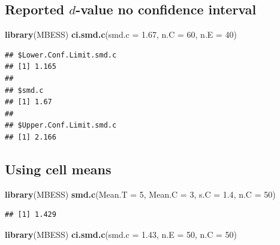 \documentclass[
]{krantz}
\makeatletter
\newenvironment{Shaded}{\begin{snugshade}}{\end{snugshade}}
\newcommand{\DataTypeTok}[1]{\textcolor[rgb]{0.27,0.27,0.27}{#1}}
\newcommand{\DecValTok}[1]{\textcolor[rgb]{0.06,0.06,0.06}{#1}}
\newcommand{\FloatTok}[1]{\textcolor[rgb]{0.06,0.06,0.06}{#1}}
\newcommand{\KeywordTok}[1]{\textcolor[rgb]{0.27,0.27,0.27}{\textbf{#1}}}
\newcommand{\NormalTok}[1]{#1}
\newenvironment{kframe}{%
\medskip{}
\setlength{\fboxsep}{.8em}
 \def\at@end@of@kframe{}%
 \ifinner\ifhmode%
  \def\at@end@of@kframe{\end{minipage}}%
  \begin{minipage}{\columnwidth}%
 \fi\fi%
 \def\FrameCommand##1{\hskip\@totalleftmargin \hskip-\fboxsep
 \colorbox{shadecolor}{##1}\hskip-\fboxsep
     \hskip-\linewidth \hskip-\@totalleftmargin \hskip\columnwidth}%
 \MakeFramed {\advance\hsize-\width
   \@totalleftmargin\z@ \linewidth\hsize
   \@setminipage}}%
 {\par\unskip\endMakeFramed%
 \at@end@of@kframe}
\renewenvironment{Shaded}{\begin{kframe}}{\end{kframe}}
\makeatother
\begin{document}
\hypertarget{reported-d-value-no-confidence-interval-1}{%
\subsection{\texorpdfstring{Reported \(d\)-value no confidence interval}{Reported d-value no confidence interval}}\label{reported-d-value-no-confidence-interval-1}}

\begin{Shaded}
\begin{Highlighting}[]
\KeywordTok{library}\NormalTok{(MBESS)}
\KeywordTok{ci.smd.c}\NormalTok{(}\DataTypeTok{smd.c =} \FloatTok{1.67}\NormalTok{, }\DataTypeTok{n.C =} \DecValTok{60}\NormalTok{, }\DataTypeTok{n.E =} \DecValTok{40}\NormalTok{) }
\end{Highlighting}
\end{Shaded}

\begin{verbatim}
## $Lower.Conf.Limit.smd.c
## [1] 1.165
## 
## $smd.c
## [1] 1.67
## 
## $Upper.Conf.Limit.smd.c
## [1] 2.166
\end{verbatim}

\hypertarget{using-cell-means-1}{%
\subsection{Using cell means}\label{using-cell-means-1}}

\begin{Shaded}
\begin{Highlighting}[]
\KeywordTok{library}\NormalTok{(MBESS)}
\KeywordTok{smd.c}\NormalTok{(}\DataTypeTok{Mean.T =} \DecValTok{5}\NormalTok{,}
    \DataTypeTok{Mean.C =} \DecValTok{3}\NormalTok{, }
    \DataTypeTok{s.C =} \FloatTok{1.4}\NormalTok{, }
    \DataTypeTok{n.C =} \DecValTok{50}\NormalTok{) }
\end{Highlighting}
\end{Shaded}

\begin{verbatim}
## [1] 1.429
\end{verbatim}

\begin{Shaded}
\begin{Highlighting}[]
\KeywordTok{library}\NormalTok{(MBESS)}
\KeywordTok{ci.smd.c}\NormalTok{(}\DataTypeTok{smd.c =} \FloatTok{1.43}\NormalTok{, }\DataTypeTok{n.E =} \DecValTok{50}\NormalTok{, }\DataTypeTok{n.C =} \DecValTok{50}\NormalTok{) }
\end{Highlighting}
\end{Shaded}
\end{document}

